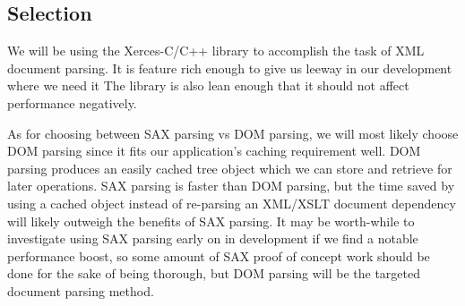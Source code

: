 \subsection{Selection}

We will be using the Xerces-C/C++ library to accomplish the task of XML document parsing.
It is feature rich enough to give us leeway in our development where we need it
The library is also lean enough that it should not affect performance negatively.

As for choosing between SAX parsing vs DOM parsing, we will most likely choose DOM parsing since it fits our application's caching requirement well.
DOM parsing produces an easily cached tree object which we can store and retrieve for later operations.
SAX parsing is faster than DOM parsing, but the time saved by using a cached object instead of re-parsing an XML/XSLT document dependency will likely outweigh the benefits of SAX parsing.
It may be worth-while to investigate using SAX parsing early on in development if we find a notable performance boost, so some amount of SAX proof of concept work should be done for the sake of being thorough, but DOM parsing will be the targeted document parsing method.
